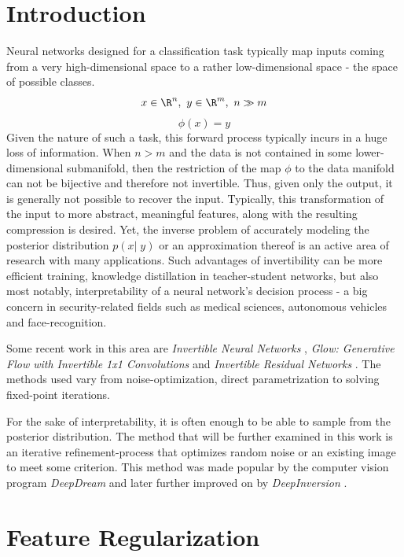\chapter{Introduction}

\label{Introduction}

Neural networks designed for a classification task typically map inputs coming from a very high-dimensional space to a rather low-dimensional space - the space of possible classes.
$$
x \in \R^n,\ y \in \R^m ,\ n \gg m
$$
$$\phi (x) = y
$$
Given the nature of such a task, this forward process typically incurs in a huge loss of information. When $n > m$ and the data is not contained in some lower-dimensional submanifold, then the restriction of the map $\phi$ to the data manifold can not be bijective and therefore not invertible. 
Thus, given only the output, it is generally not possible to recover the input.
Typically, this transformation of the input to more abstract, meaningful features, along with the resulting compression is desired. Yet, the inverse problem of accurately modeling the posterior distribution $p(x|\;y)$ or an approximation thereof is an active area of research with many applications.
Such advantages of invertibility can be more efficient training, knowledge distillation in teacher-student networks, but also most notably, interpretability of a neural network's decision process - a big concern in security-related fields such as medical sciences, autonomous vehicles and face-recognition. 

Some recent work in this area are \textit{Invertible Neural Networks} \citep{ardizzone2018analyzing} , \textit{Glow: Generative Flow with Invertible 1x1 Convolutions} \citep{kingma2018glow} and \textit{Invertible Residual Networks} \citep{behrmann2018invertible}. The methods used vary from noise-optimization, direct parametrization to solving fixed-point iterations.

For the sake of interpretability, it is often enough to be able to sample from the posterior distribution.
The method that will be further examined in this work is an iterative refinement-process that optimizes random noise or an existing image to meet some criterion. This method was made popular by the computer vision program \textit{DeepDream} \citep{DeepDream} and later further improved on by \textit{DeepInversion} \citep{DeepInversion}.

\chapter{Feature Regularization} %


